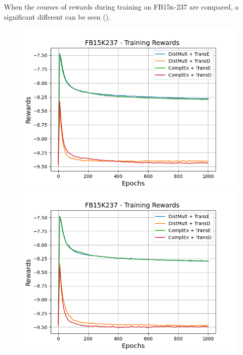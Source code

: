 When the courses of rewards during training on \textsc{FB15k-237} are compared, a significant different can be seen ().
\begin{figure}
    \centering
    \begin{minipage}{.5\textwidth}
      \centering
      \includegraphics[width=0.9\linewidth]{figures/results/gan_train/not_pretrained/uncertainty/max_distribution/entropy/fb15k237/1k_epochs/uncertainty_fb15k237_rew.png}
    \end{minipage}%
    \begin{minipage}{.5\textwidth}
      \centering
      \includegraphics[width=0.9\linewidth]{figures/results/gan_train/not_pretrained/uncertainty/max_distribution/least_confidence/fb15k237/uncertainty_fb15k237_rew.png}
    \end{minipage}
    \begin{minipage}{.5\textwidth}

\end{minipage}
\end{figure}
